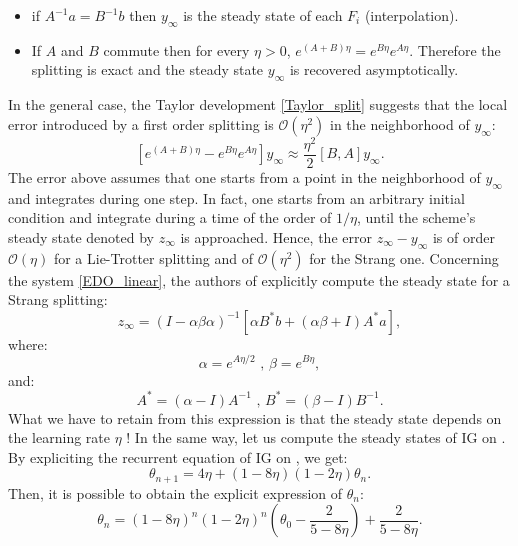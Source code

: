\documentclass[article,authoryear,jmlmc]{beg_32}             %
\begin{document}
\begin{itemize}
	\item if $A^{-1}a=B^{-1}b$  then $y_{\infty}$ is the steady state of each $F_i$ (interpolation).
	\item If $A$ and $B$ commute then for every $\eta>0$, $e^{(A+B)\eta}=e^{B\eta}e^{A\eta}$. Therefore the splitting is exact and the steady state $y_{\infty}$ is recovered asymptotically. 
\end{itemize}
In the general case, the Taylor development \eqref{Taylor_split} suggests that the local error introduced by a first order splitting is $\mathcal{O}(\eta^2)$ in the neighborhood of $y_{\infty}$:
\begin{equation*}
	\left[e^{(A+B)\eta}-e^{B\eta}e^{A\eta}\right]y_{\infty} \approx \frac{\eta^2}{2}\left[B,A\right]y_{\infty}.
\end{equation*}
The error above assumes that one starts from a point in the neighborhood of $y_{\infty}$ and integrates during one step. In fact, one starts from an arbitrary initial condition and
integrate during a time of the order of $1/\eta$, until the scheme's steady state denoted by $z_{\infty}$ is approached. Hence, the error $z_{\infty}-y_{\infty}$ is of order $\mathcal{O}(\eta)$ for a Lie-Trotter splitting and of $\mathcal{O}(\eta^2)$ for the Strang one. Concerning the system \eqref{EDO_linear}, the authors of \cite{rebalanced_splitting} explicitly compute the steady state for a Strang splitting:
\begin{equation*}
	z_{\infty} = (I-\alpha\beta\alpha)^{-1}\left[\alpha B^*b + (\alpha\beta+I)A^*a\right],
\end{equation*}
where:
\begin{equation*}
	\alpha = e^{A\eta/2} \text{ , } \beta = e^{B\eta},
\end{equation*}
and:
\begin{equation*}
	A^* = (\alpha-I)A^{-1} \text{ , } B^* = (\beta-I) B^{-1}.
\end{equation*}
What we have to retain from this expression is that the steady state depends on the learning rate $\eta$ ! In the same way, let us compute the steady states of IG on \exOne. By expliciting the recurrent equation of IG on \exOne, we get:
\begin{equation*}
	\theta_{n+1} = 4\eta + (1-8\eta)(1-2\eta)\theta_n.
\end{equation*} 
Then, it is possible to obtain the explicit expression of $\theta_n$:
\begin{equation*}
	\theta_n = (1-8\eta)^n(1-2\eta)^n\left(\theta_0-\dfrac{2}{5-8\eta}\right) + \dfrac{2}{5-8\eta}.
\end{equation*}
\end{document}

